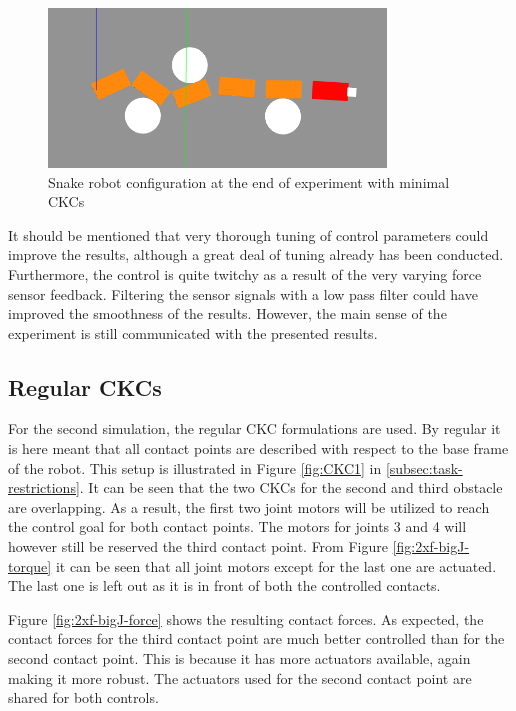 \begin{figure}
    \centering
    \includegraphics[width=0.8\textwidth]{figures/experiments/2xf/2force-gazebo.png}
    \caption{Snake robot configuration at the end of experiment with minimal CKCs}
    \label{fig:2xf-miniJ-gazebo}
\end{figure}

It should be mentioned that very thorough tuning of control parameters could improve the results, although a great deal of tuning already has been conducted. Furthermore, the control is quite twitchy as a result of the very varying force sensor feedback. Filtering the sensor signals with a low pass filter could have improved the smoothness of the results. However, the main sense of the experiment is still communicated with the presented results.

\subsection{Regular CKCs}

For the second simulation, the regular CKC formulations are used. By regular it is here meant that all contact points are described with respect to the base frame of the robot. This setup is illustrated in Figure \ref{fig:CKC1} in \ref{subsec:task-restrictions}. It can be seen that the two CKCs for the second and third obstacle are overlapping. As a result, the first two joint motors will be utilized to reach the control goal for both contact points. The motors for joints 3 and 4 will however still be reserved the third contact point. From Figure \ref{fig:2xf-bigJ-torque} it can be seen that all joint motors except for the last one are actuated. The last one is left out as it is in front of both the controlled contacts. 

Figure \ref{fig:2xf-bigJ-force} shows the resulting contact forces. As expected, the contact forces for the third contact point are much better controlled than for the second contact point. This is because it has more actuators available, again making it more robust. The actuators used for the second contact point are shared for both controls.

